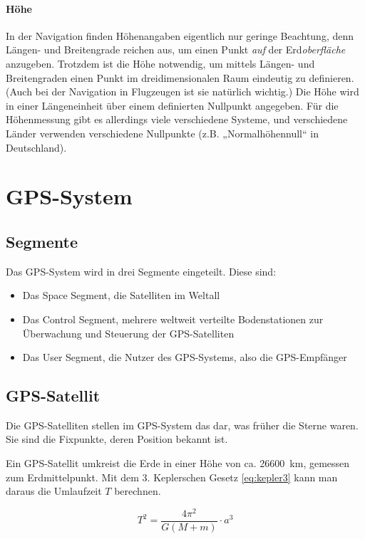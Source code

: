 \documentclass[12pt,a4paper]{scrartcl}
\begin{document}
\paragraph{Höhe}
In der Navigation finden Höhenangaben eigentlich nur geringe Beachtung, denn Längen- und Breitengrade reichen aus, um einen Punkt \emph{auf} der Erd\emph{oberfläche} anzugeben. Trotzdem ist die Höhe notwendig, um mittels Längen- und Breitengraden einen Punkt im dreidimensionalen Raum eindeutig zu definieren. (Auch bei der Navigation in Flugzeugen ist sie natürlich wichtig.) Die Höhe wird in einer Längeneinheit über einem definierten Nullpunkt angegeben. Für die Höhenmessung gibt es allerdings viele verschiedene Systeme, und verschiedene Länder verwenden verschiedene Nullpunkte (z.B. „Normalhöhennull“ in Deutschland).

\section{GPS-System}

\subsection{Segmente}
Das GPS-System wird in drei Segmente eingeteilt. Diese sind:
\begin{itemize}
\item Das Space Segment, die Satelliten im Weltall
\item Das Control Segment, mehrere weltweit verteilte Bodenstationen zur Überwachung und Steuerung der GPS-Satelliten
\item Das User Segment, die Nutzer des GPS-Systems, also die GPS-Empfänger
\end{itemize}
\cite{gpsgov_segments}

\subsection{GPS-Satellit}
Die GPS-Satelliten stellen im GPS-System das dar, was früher die Sterne waren. Sie sind die Fixpunkte, deren Position bekannt ist.

Ein GPS-Satellit umkreist die Erde in einer Höhe von ca. \SI{26600}{\kilo\meter}, gemessen zum Erdmittelpunkt.
Mit dem 3. Keplerschen Gesetz \eqref{eq:kepler3} kann man daraus die Umlaufzeit $T$ berechnen.

\begin{equation}
\label{eq:kepler3}
T^2 = \frac{4 \pi^2}{G (M + m)} \cdot a^3
\end{equation}
\cite{wiki_kepler}
\end{document}
